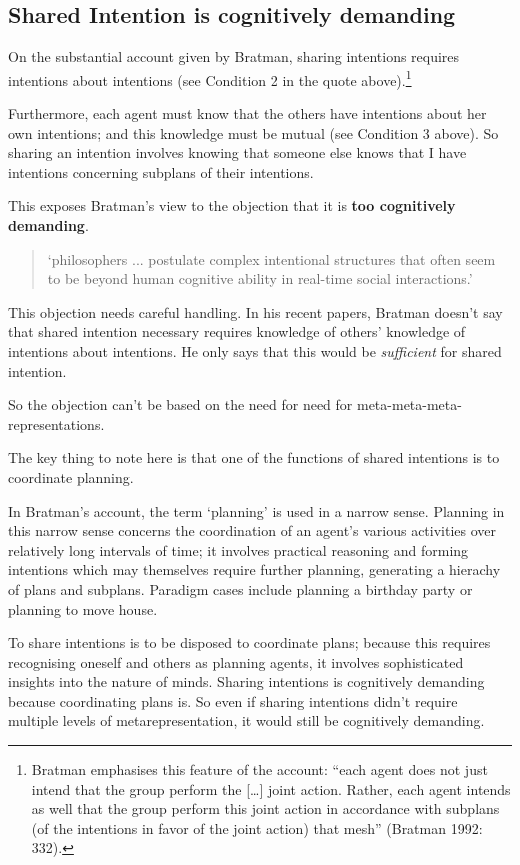 \documentclass[12pt,a4paper]{extarticle}
\begin{document}
\subsection{Shared Intention is cognitively demanding}
On the substantial account given by Bratman, sharing intentions requires intentions about intentions (see Condition 2 in the quote above).\footnote{
Bratman emphasises this feature of the account: “each agent does not just intend that the group perform the […] joint action. Rather, each agent intends as well that the group perform this joint action in accordance with subplans (of the intentions in favor of the joint action) that mesh” (Bratman 1992: 332).
}

Furthermore, each agent must know that the others have intentions about her own intentions; and this knowledge must be mutual (see Condition 3 above).  So sharing an intention involves knowing that someone else knows that I have intentions concerning subplans of their intentions.  
   
This exposes Bratman's view to the objection that it is \textbf{too cognitively demanding}.  
%
\begin{quote}
`philosophers ... postulate complex intentional structures that often seem to be beyond human cognitive ability in real-time social interactions.'
\citep[p.\ 2022]{Knoblich:2008hy}
\end{quote}
%
This objection needs careful handling.  
In his recent papers, Bratman doesn't say that shared intention necessary requires knowledge of others' knowledge of intentions about intentions.  He only says that this would be \emph{sufficient} for shared intention.

So the objection can't be based on the need for need for meta-meta-meta-representations.

The key thing to note here is that one of the functions of shared intentions is to coordinate planning.  

In Bratman’s account, the term `planning' is used in a narrow sense.  Planning in this narrow sense concerns the coordination of an agent’s various activities over relatively long intervals of time; it involves practical reasoning and forming intentions which may themselves require further planning, generating a hierachy of plans and subplans.  Paradigm cases include planning a birthday party or planning to move house.   

To share intentions is to be disposed to coordinate plans; because this requires recognising oneself and others as planning agents, it involves sophisticated insights into the nature of minds.  
Sharing intentions is cognitively demanding because coordinating plans is.
So even if sharing intentions didn’t require multiple levels of metarepresentation, it would still be cognitively demanding.
\end{document}
